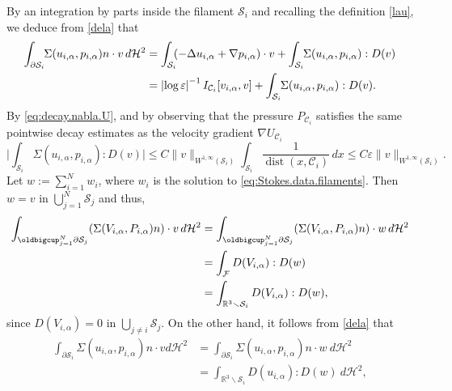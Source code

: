 \documentclass[JEP,XML,SOM,Unicode, NoEqCountersInSection,NoFloatCountersInSection,published]{cedram}
\newcommand{\R}{\mathbb{R}}
\let\eps\varepsilon
\newcommand{\dd}{\,d}
\DeclareMathOperator{\dist}{dist}
\theoremstyle{definition}
\theoremstyle{remark}
\begin{document}
By an integration by parts inside the filament $\mathcal S_{i}$ and recalling the definition \eqref{lau}, we deduce from \eqref{dela} that
\begin{equation}
\begin{aligned}
\int_{\partial \mathcal S_{i}}\hspace*{-1mm} \Sigma(u_{i,\alpha},p_{i,\alpha}) n \cdot v \, d\mathcal{H}^2
&= \int_{\mathcal S_{i}}\hspace*{-1mm} (-\Delta u_{i,\alpha} + \nabla p_{i,\alpha}) \cdot v + \int_{\mathcal S_{i}}\hspace*{-1mm} \Sigma(u_{i,\alpha},p_{i,\alpha}) : D(v) \\
\label{24}
& = \left|\log \eps\right|^{-1} I_{\mathcal{C}_i } [v_{i,\alpha},v]
+ \int_{\mathcal S_{i}}\hspace*{-1mm} \Sigma(u_{i,\alpha},p_{i,\alpha}) : D(v).
\end{aligned}
\end{equation}
By \eqref{eq:decay.nabla.U}, and by observing that the pressure $P_{\mathcal C_i}$ satisfies the same pointwise decay estimates as the velocity gradient $\nabla U_{\mathcal C_i}$
\begin{equation}
\label{doute}
\biggl|\int_{\mathcal S_{i}} \Sigma(u_{i,\alpha},p_{i,\alpha}) : D(v)\biggr| \leq C \|v\|_{W^{1,\infty}{(\mathcal S_{i})}} \int_{\mathcal S_{i}} \frac 1 {\dist(x,\mathcal C_i)} \dd x \leq C \eps \|v\|_{W^{1,\infty}{(\mathcal S_{i})}}.
\end{equation}
Let $w := \sum_{i=1}^N w_i$, where $w_i$ is the solution to \eqref{eq:Stokes.data.filaments}.
Then $w = v$ in $\bigcup_{j=1}^N \mathcal S_j$ and thus,
\begin{align*}
\int_{\oldbigcup_{j=1}^N \partial \mathcal S_j} (\Sigma (V_{i,\alpha}, P_{i,\alpha}) n) \cdot v \, d\mathcal{H}^2
&= \int_{\oldbigcup_{j=1}^N \partial \mathcal S_j} (\Sigma (V_{i,\alpha}, P_{i,\alpha}) n) \cdot w \, d\mathcal{H}^2
\\ & =
\int_{\mathcal F} D(V_{i,\alpha}) : D(w)
\\ & =
\int_{\R^3 \smallsetminus \mathcal S_i } D(V_{i,\alpha}) : D(w),
\end{align*}
since
$D (V_{i, \alpha}) = 0 $ in $\bigcup_{{j\neq i}} \mathcal S_j$. On the other hand, it follows from \eqref{dela} that
\begin{align*}
\int_{\partial \mathcal S_i} \Sigma (u_{i,\alpha}, p_{i,\alpha}) n \cdot v {d\mathcal{H}^2} &= \int_{\partial \mathcal S_i} \Sigma (u_{i,\alpha}, p_{i,\alpha}) n \cdot w {\
d\mathcal{H}^2}
\\ &=
\int_{\R^3 \smallsetminus \mathcal S_i } D(u_{i,\alpha}) : D(w) {\
d\mathcal{H}^2},
\end{align*}
\end{document}
